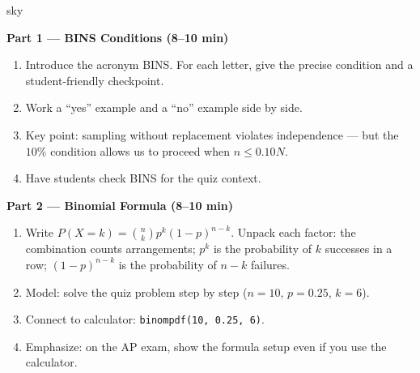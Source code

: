 \documentclass[10pt]{article}
\begin{document}
\begin{skillbox}[Lesson]{sky}
\begin{minipage}[t]{0.48\linewidth}
    \textbf{Part 1 --- BINS Conditions (8--10 min)}
    \begin{enumerate}
        \item Introduce the acronym BINS. For each letter, give the
              precise condition and a student-friendly checkpoint.
        \item Work a ``yes'' example and a ``no'' example side by side.
        \item Key point: sampling without replacement violates independence ---
              but the $10\%$ condition allows us to proceed when $n \le 0.10N$.
        \item Have students check BINS for the quiz context.
    \end{enumerate}
\end{minipage}
\hfill
\begin{minipage}[t]{0.48\linewidth}
    \textbf{Part 2 --- Binomial Formula (8--10 min)}
    \begin{enumerate}
        \item Write $P(X = k) = \binom{n}{k} p^k (1-p)^{n-k}$.
              Unpack each factor: the combination counts arrangements; $p^k$
              is the probability of $k$ successes in a row; $(1-p)^{n-k}$
              is the probability of $n-k$ failures.
        \item Model: solve the quiz problem step by step ($n=10$, $p=0.25$, $k=6$).
        \item Connect to calculator: \texttt{binompdf(10, 0.25, 6)}.
        \item Emphasize: on the AP exam, show the formula setup even if you
              use the calculator.
    \end{enumerate}
\end{minipage}
\end{skillbox}
\end{document}

